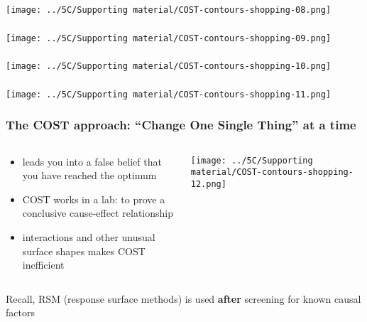 \documentclass[handout,11pt,aspectratio=169,mathserif]{beamer}
\begin{document}
\begin{frame}\frametitle{}
	\centerline{\texttt{[image: ../5C/Supporting material/COST-contours-shopping-08.png]}}
\end{frame}
\begin{frame}\frametitle{}
	\centerline{\texttt{[image: ../5C/Supporting material/COST-contours-shopping-09.png]}}
\end{frame}
\begin{frame}\frametitle{}
	\centerline{\texttt{[image: ../5C/Supporting material/COST-contours-shopping-10.png]}}
\end{frame}
\begin{frame}\frametitle{}
	\centerline{\texttt{[image: ../5C/Supporting material/COST-contours-shopping-11.png]}}
\end{frame}

\begin{frame}\frametitle{The COST approach: {\color{myGreen}``Change One Single Thing'' at a time}}
	\begin{columns}[b]
			\begin{exampleblock}{}
				\begin{itemize}
					\item	leads you into a false belief that you have reached the optimum \pause
					\item	{\color{myOrange}COST works in a lab: to prove a conclusive cause-effect relationship}
					\item	interactions and other unusual surface shapes makes COST inefficient \pause
					
				\end{itemize}
			\end{exampleblock}
		
			\centerline{\texttt{[image: ../5C/Supporting material/COST-contours-shopping-12.png]}}
	\end{columns}
	
	\pause
	\vspace{0.5cm}
	{\color{blue} Recall, RSM {\small (response surface methods)} is used \textbf{after} screening for known causal factors}

\end{frame}
\end{document}

